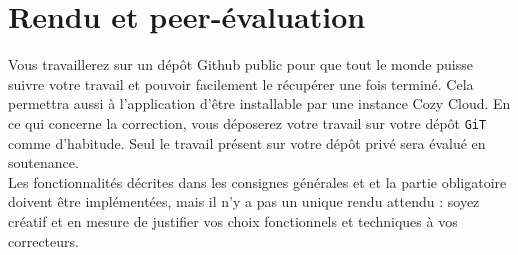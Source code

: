 \documentclass{42-fr}
\begin{document}



\chapter{Rendu et peer-\'evaluation}

	Vous travaillerez sur un d\'ep\^ot Github public pour que tout le monde puisse suivre
	votre travail et pouvoir facilement le récupérer une fois terminé. Cela permettra
	aussi à l'application d'\^etre installable par une instance Cozy Cloud.\newline
	En ce qui concerne la correction, vous d\'eposerez votre travail sur votre d\'ep\^ot
	\texttt{GiT} comme d'habitude.\newline
	Seul le travail pr\'esent sur votre d\'ep\^ot priv\'e sera \'evalu\'e en soutenance.\\
	Les fonctionnalit\'es d\'ecrites dans les consignes g\'en\'erales et et la partie
	obligatoire doivent \^etre impl\'ementées, mais il n'y a pas un unique rendu attendu :
	soyez cr\'eatif et en mesure de justifier vos choix fonctionnels et techniques à vos
	correcteurs.



\end{document}
